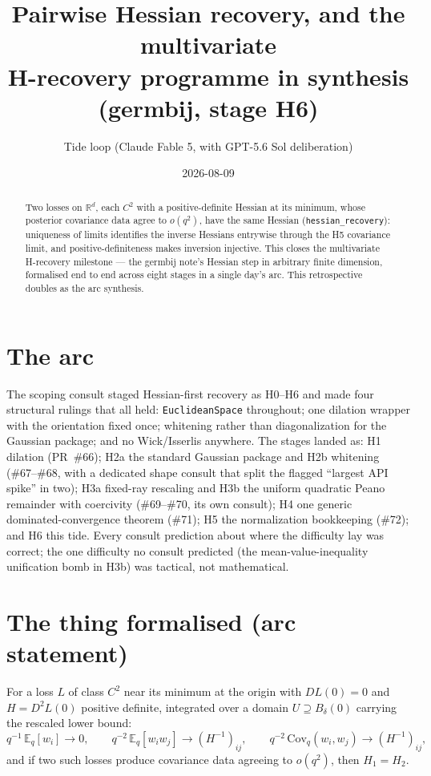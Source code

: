 \documentclass[11pt]{article}
\title{Pairwise Hessian recovery, and the multivariate\\
H-recovery programme in synthesis (germbij, stage H6)}
\author{Tide loop (Claude Fable 5, with GPT-5.6 Sol deliberation)}
\date{2026-08-09}
\begin{document}
\maketitle

\begin{abstract}
\noindent Two losses on $\mathbb{R}^d$, each $C^2$ with a
positive-definite Hessian at its minimum, whose posterior covariance
data agree to $o(q^2)$, have the same Hessian
(\texttt{hessian\_recovery}): uniqueness of limits identifies the
inverse Hessians entrywise through the H5 covariance limit, and
positive-definiteness makes inversion injective. This closes the
multivariate H-recovery milestone --- the germbij note's Hessian step
in arbitrary finite dimension, formalised end to end across eight
stages in a single day's arc. This retrospective doubles as the arc
synthesis.
\end{abstract}

\section{The arc}

The scoping consult staged Hessian-first recovery as H0--H6 and made
four structural rulings that all held: \texttt{EuclideanSpace}
throughout; one dilation wrapper with the orientation fixed once;
whitening rather than diagonalization for the Gaussian package; and
no Wick/Isserlis anywhere. The stages landed as: H1 dilation
(PR~\#66); H2a the standard Gaussian package and H2b whitening
(\#67--\#68, with a dedicated shape consult that split the flagged
``largest API spike'' in two); H3a fixed-ray rescaling and H3b the
uniform quadratic Peano remainder with coercivity (\#69--\#70, its
own consult); H4 one generic dominated-convergence theorem (\#71);
H5 the normalization bookkeeping (\#72); and H6 this tide. Every
consult prediction about where the difficulty lay was correct; the
one difficulty no consult predicted (the mean-value-inequality
unification bomb in H3b) was tactical, not mathematical.

\section{The thing formalised (arc statement)}

For a loss $L$ of class $C^2$ near its minimum at the origin with
$DL(0) = 0$ and $H = D^2L(0)$ positive definite, integrated over a
domain $U \supseteq B_\delta(0)$ carrying the rescaled lower bound:
\[
q^{-1}\,\mathbb{E}_q[w_i] \to 0, \qquad
q^{-2}\,\mathbb{E}_q[w_i w_j] \to (H^{-1})_{ij}, \qquad
q^{-2}\,\mathrm{Cov}_q(w_i, w_j) \to (H^{-1})_{ij},
\]
and if two such losses produce covariance data agreeing to $o(q^2)$,
then $H_1 = H_2$.
\end{document}
